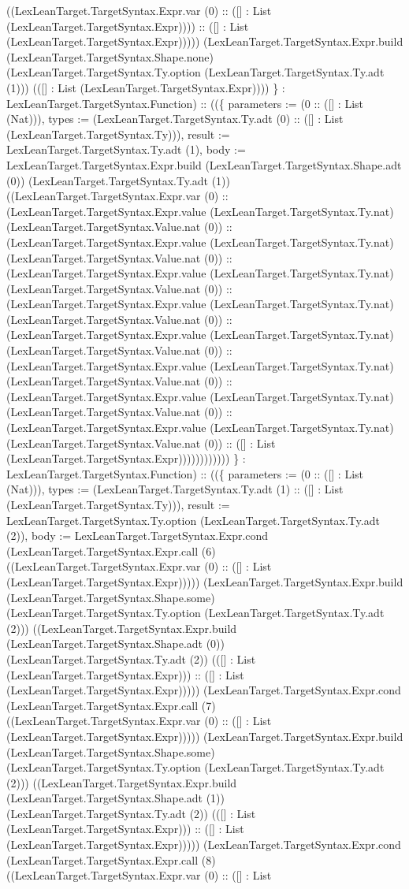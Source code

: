 \documentclass[11pt]{article}
\begin{document}
((LexLeanTarget.TargetSyntax.Expr.var (0) :: ([] : List (LexLeanTarget.TargetSyntax.Expr)))) :: ([] : List (LexLeanTarget.TargetSyntax.Expr))))) (LexLeanTarget.TargetSyntax.Expr.build (LexLeanTarget.TargetSyntax.Shape.none) (LexLeanTarget.TargetSyntax.Ty.option (LexLeanTarget.TargetSyntax.Ty.adt (1))) (([] : List (LexLeanTarget.TargetSyntax.Expr)))) \} : LexLeanTarget.TargetSyntax.Function) :: ((\{ parameters := (0 :: ([] : List (Nat))), types := (LexLeanTarget.TargetSyntax.Ty.adt (0) :: ([] : List (LexLeanTarget.TargetSyntax.Ty))), result := LexLeanTarget.TargetSyntax.Ty.adt (1), body := LexLeanTarget.TargetSyntax.Expr.build (LexLeanTarget.TargetSyntax.Shape.adt (0)) (LexLeanTarget.TargetSyntax.Ty.adt (1)) ((LexLeanTarget.TargetSyntax.Expr.var (0) :: (LexLeanTarget.TargetSyntax.Expr.value (LexLeanTarget.TargetSyntax.Ty.nat) (LexLeanTarget.TargetSyntax.Value.nat (0)) :: (LexLeanTarget.TargetSyntax.Expr.value (LexLeanTarget.TargetSyntax.Ty.nat) (LexLeanTarget.TargetSyntax.Value.nat (0)) :: (LexLeanTarget.TargetSyntax.Expr.value (LexLeanTarget.TargetSyntax.Ty.nat) (LexLeanTarget.TargetSyntax.Value.nat (0)) :: (LexLeanTarget.TargetSyntax.Expr.value (LexLeanTarget.TargetSyntax.Ty.nat) (LexLeanTarget.TargetSyntax.Value.nat (0)) :: (LexLeanTarget.TargetSyntax.Expr.value (LexLeanTarget.TargetSyntax.Ty.nat) (LexLeanTarget.TargetSyntax.Value.nat (0)) :: (LexLeanTarget.TargetSyntax.Expr.value (LexLeanTarget.TargetSyntax.Ty.nat) (LexLeanTarget.TargetSyntax.Value.nat (0)) :: (LexLeanTarget.TargetSyntax.Expr.value (LexLeanTarget.TargetSyntax.Ty.nat) (LexLeanTarget.TargetSyntax.Value.nat (0)) :: (LexLeanTarget.TargetSyntax.Expr.value (LexLeanTarget.TargetSyntax.Ty.nat) (LexLeanTarget.TargetSyntax.Value.nat (0)) :: ([] : List (LexLeanTarget.TargetSyntax.Expr)))))))))))) \} : LexLeanTarget.TargetSyntax.Function) :: ((\{ parameters := (0 :: ([] : List (Nat))), types := (LexLeanTarget.TargetSyntax.Ty.adt (1) :: ([] : List (LexLeanTarget.TargetSyntax.Ty))), result := LexLeanTarget.TargetSyntax.Ty.option (LexLeanTarget.TargetSyntax.Ty.adt (2)), body := LexLeanTarget.TargetSyntax.Expr.cond (LexLeanTarget.TargetSyntax.Expr.call (6) ((LexLeanTarget.TargetSyntax.Expr.var (0) :: ([] : List (LexLeanTarget.TargetSyntax.Expr))))) (LexLeanTarget.TargetSyntax.Expr.build (LexLeanTarget.TargetSyntax.Shape.some) (LexLeanTarget.TargetSyntax.Ty.option (LexLeanTarget.TargetSyntax.Ty.adt (2))) ((LexLeanTarget.TargetSyntax.Expr.build (LexLeanTarget.TargetSyntax.Shape.adt (0)) (LexLeanTarget.TargetSyntax.Ty.adt (2)) (([] : List (LexLeanTarget.TargetSyntax.Expr))) :: ([] : List (LexLeanTarget.TargetSyntax.Expr))))) (LexLeanTarget.TargetSyntax.Expr.cond (LexLeanTarget.TargetSyntax.Expr.call (7) ((LexLeanTarget.TargetSyntax.Expr.var (0) :: ([] : List (LexLeanTarget.TargetSyntax.Expr))))) (LexLeanTarget.TargetSyntax.Expr.build (LexLeanTarget.TargetSyntax.Shape.some) (LexLeanTarget.TargetSyntax.Ty.option (LexLeanTarget.TargetSyntax.Ty.adt (2))) ((LexLeanTarget.TargetSyntax.Expr.build (LexLeanTarget.TargetSyntax.Shape.adt (1)) (LexLeanTarget.TargetSyntax.Ty.adt (2)) (([] : List (LexLeanTarget.TargetSyntax.Expr))) :: ([] : List (LexLeanTarget.TargetSyntax.Expr))))) (LexLeanTarget.TargetSyntax.Expr.cond (LexLeanTarget.TargetSyntax.Expr.call (8) ((LexLeanTarget.TargetSyntax.Expr.var (0) :: ([] : List 
\end{document}
